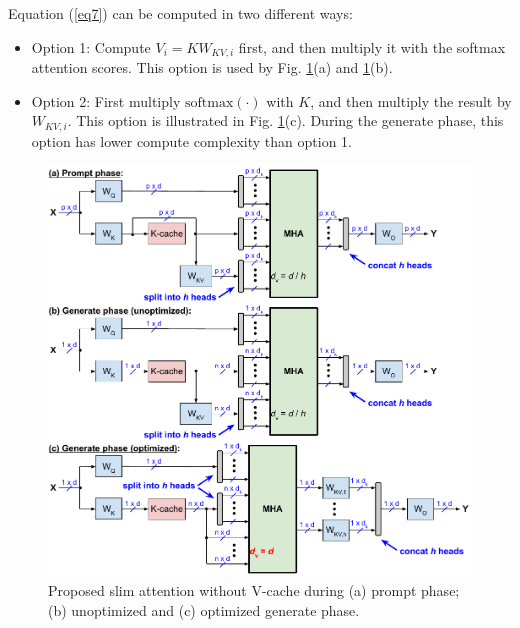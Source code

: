 \documentclass{article}
\numberwithin{equation}{section} %
\begin{document}
Equation (\ref{eq7}) can be computed in two different ways:
\begin{itemize}[topsep=-1pt, itemsep=-1pt]
  \item Option 1: Compute $V_i = K W_{KV,i}$ first, and then multiply it with the softmax attention scores. This option is used by Fig. \ref{fig3}(a) and \ref{fig3}(b).
  \item Option 2: First multiply $\text{softmax}(\cdot)$ with $K$, and then multiply the result by $W_{KV,i}$.  This option is illustrated in Fig. \ref{fig3}(c). During the generate phase, this option has lower compute complexity than option 1.
\end{itemize}

\begin{figure}[h!] \centering
  \includegraphics[scale=0.9]{figs/slim_fig3.pdf}
  \caption{Proposed slim attention without V-cache during (a) prompt phase; (b) unoptimized and (c) optimized generate phase.}
\label{fig3} \end{figure}
\end{document}
